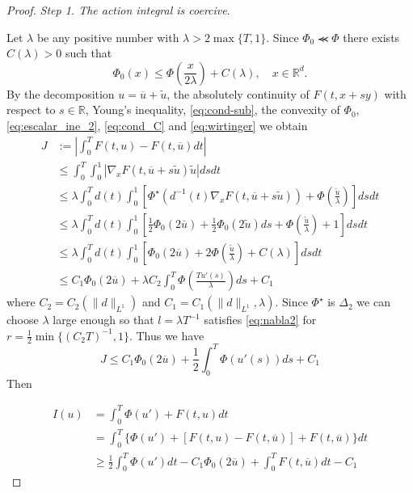 \documentclass[twoside]{article}
\theoremstyle{remark}
\newcommand{\rr}{\mathbb{R}}
\renewcommand{\leq}{\leqslant}
\renewcommand{\geq}{\geqslant}
\begin{document}
\begin{proof} \emph{Step 1. The action integral is coercive}.
 
  
  Let $\lambda$ be any positive number with $\lambda>2\max\{T,1\}$. Since $\Phi_0\llcurly \Phi$ there exists $C(\lambda)>0$ such that 
  \begin{equation}\label{eq:cond_C}
    \Phi_0(x)\leq \Phi\left(\frac{x}{2\lambda}\right)+C(\lambda),\quad  x\in\rr^d. 
  \end{equation}
By the decomposition $u=\overline{u}+\tilde{u}$, the absolutely continuity of $F(t,x+sy)$ with respect to $s\in\rr$,  Young's inequality, \eqref{eq:cond-sub}, the convexity of $\Phi_0$, \eqref{eq:escalar_ine_2}, \eqref{eq:cond_C} and \eqref{eq:wirtinger}  we obtain
\begin{equation*}\label{eq:cota-dif-F}
\begin{split}
J&:=\left|\int_0^T F(t,u)-F(t,\overline{u})dt\right|
\\
&\leq \int_0^T \int_0^1 |\nabla_x F(t,\overline{u}+s\tilde{u})\tilde{u}|dsdt
\\
&\leq
\lambda \int_0^T d(t) \int_0^1 \left[ \Phi^{\star}\left(d^{-1}(t)\nabla_xF(t,\overline{u}+s\tilde{u})\right)+\Phi\left(\frac{\tilde{u}}{\lambda}\right)\right]dsdt
\\
&\leq
\lambda\int_0^T d(t)\int_0^1\left[ \frac12\Phi_0(2\overline{u})+\frac12\Phi_0(2\tilde{u})ds+\Phi\left(\frac{\tilde{u}}{\lambda}\right)+1 \right]dsdt
\\
&\leq
\lambda\int_0^T d(t)\int_0^1\left[ \Phi_0(2\overline{u})+2\Phi\left(\frac{\tilde{u}}{\lambda}\right)+C(\lambda) \right]dsdt
\\
&\leq C_1 \Phi_0(2\overline{u})+\lambda C_2 \int_0^T \Phi\left(\frac{Tu'(s)}{\lambda}\right)ds+C_1
\end{split}
\end{equation*}
where $C_2=C_2(\|d\|_{L^1})$ and $C_1=C_1(\|d\|_{L^1},\lambda)$.  Since $\Phi^{\star}$ is $\Delta_2$ we can choose $\lambda$ large enough so that $l=\lambda T^{-1}$ satisfies  \eqref{eq:nabla2} for $r=\frac12 \min\{(C_2T)^{-1},1\}$. Thus we have
\[
 J\leq C_1 \Phi_0(2\overline{u})+\frac12 \int_0^T \Phi\left(u'(s)\right)ds+C_1
\]
Then

\begin{equation}
\begin{split}
I(u)&=\int_0^T  \Phi(u')+F(t,u)dt\\
&= \int_0^T \{\Phi(u')+[F(t,u)-F(t,\overline{u})]+F(t,\overline{u})\}dt
\\
&\geq
\frac12\int_0^T \Phi(u')dt-C_1\Phi_0(2 \overline{u})+\int_0^T F(t,\overline{u})dt-C_1
\end{split}
\end{equation}


\end{proof}
\end{document}
